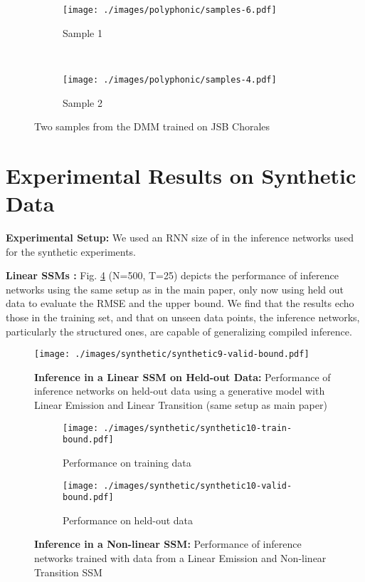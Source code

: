 \documentclass[letterpaper]{article}
\theoremstyle{plain}
\newcommand{\DKF}{DMM\xspace}
\begin{document}
{\begin{figure}[h]
	\centering
\begin{subfigure}[b]{0.23\textwidth}
	\texttt{[image: ./images/polyphonic/samples-6.pdf]}
	\caption{Sample 1}
	\label{fig:jsb-s1}
\end{subfigure}~
\begin{subfigure}[b]{0.23\textwidth}
	\texttt{[image: ./images/polyphonic/samples-4.pdf]}
	\caption{Sample 2}
	\label{fig:jsb-s2}
\end{subfigure}
\caption{Two samples from the \DKF trained on JSB Chorales}
\label{fig:poly_samples}
\end{figure} 

\newpage
\section{Experimental Results on Synthetic Data}

\textbf{Experimental Setup: } We used an RNN size of  in the inference networks used for the synthetic experiments. 

\textbf{Linear SSMs :} Fig. \ref{fig:synthetic9-valid} (N=500, T=25) depicts the performance of inference networks using the same setup as in the main paper, only now using held out data to evaluate the RMSE and the upper bound. 
We find that the results echo those in the training set, and that on unseen data points, 
the inference networks, particularly the structured ones, are capable of generalizing compiled inference. 
\begin{figure}[h]
	\texttt{[image: ./images/synthetic/synthetic9-valid-bound.pdf]}
	\caption{\textbf{Inference in a Linear SSM on Held-out Data: } Performance of inference networks on held-out data using a generative model with Linear Emission and Linear Transition (same setup as main paper)}
	\label{fig:synthetic9-valid}
\end{figure}

\begin{figure}[h]
	\centering
\begin{subfigure}[b]{0.45\textwidth}
	\texttt{[image: ./images/synthetic/synthetic10-train-bound.pdf]}
	\caption{Performance on training data}
	\label{fig:synthetic10-train}
\end{subfigure}
\begin{subfigure}[b]{0.45\textwidth}
	\texttt{[image: ./images/synthetic/synthetic10-valid-bound.pdf]}
	\caption{Performance on held-out data}
	\label{fig:synthetic10-valid}
\end{subfigure}
\caption{\textbf{Inference in a Non-linear SSM: } Performance of inference networks trained with data from a Linear Emission and Non-linear Transition SSM}
\label{fig:synth-non-linear}
\end{figure} 

}
\end{document}
